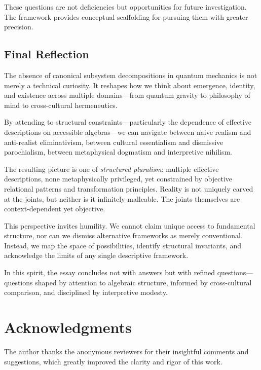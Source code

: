 \documentclass[12pt,a4paper,openany]{book}
\begin{document}
These questions are not deficiencies but opportunities for future investigation. The framework provides conceptual scaffolding for pursuing them with greater precision.

\subsection{Final Reflection}

The absence of canonical subsystem decompositions in quantum mechanics is not merely a technical curiosity. It reshapes how we think about emergence, identity, and existence across multiple domains—from quantum gravity to philosophy of mind to cross-cultural hermeneutics.

By attending to structural constraints—particularly the dependence of effective descriptions on accessible algebras—we can navigate between naive realism and anti-realist eliminativism, between cultural essentialism and dismissive parochialism, between metaphysical dogmatism and interpretive nihilism.

The resulting picture is one of \emph{structured pluralism}: multiple effective descriptions, none metaphysically privileged, yet constrained by objective relational patterns and transformation principles. Reality is not uniquely carved at the joints, but neither is it infinitely malleable. The joints themselves are context-dependent yet objective.

This perspective invites humility. We cannot claim unique access to fundamental structure, nor can we dismiss alternative frameworks as merely conventional. Instead, we map the space of possibilities, identify structural invariants, and acknowledge the limits of any single descriptive framework.

In this spirit, the essay concludes not with answers but with refined questions—questions shaped by attention to algebraic structure, informed by cross-cultural comparison, and disciplined by interpretive modesty.

\section*{Acknowledgments}

The author thanks the anonymous reviewers for their insightful comments and suggestions, which greatly improved the clarity and rigor of this work.



\end{document}
